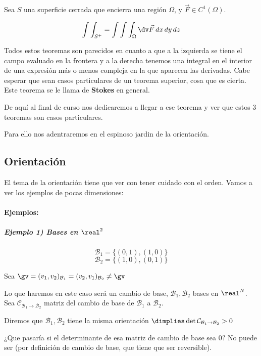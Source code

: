\begin{theorem}
Sea $S$ una superficie cerrada que encierra una región $\Omega$, y $\vec{F}\in C^1(\Omega)$.

\[ \int\int_{S^+} = \int\int\int_\Omega \dv \vec{F}\, dx\, dy\, dz \]
\end{theorem}


Todos estos teoremas son parecidos en cuanto a que a la izquierda se tiene el campo evaluado en la frontera y a la derecha tenemos una integral en el interior de una expresión más o menos compleja en la que aparecen las derivadas. Cabe esperar que sean casos particulares de un teorema superior, cosa que es cierta. Este teorema se le llama de \textbf{Stokes} en general. 

De aquí al final de curso nos dedicaremos a llegar a ese teorema y ver que estos 3 teoremas son casos particulares. 

Para ello nos adentraremos en el espinoso jardin de la orientación.

\subsection{Orientación} 
El tema de la orientación tiene que ver con tener cuidado con el orden. Vamos a ver los ejemplos de pocas dimensiones:

\paragraph{Ejemplos:}

\subparagraph{Ejemplo 1) Bases en $\real^2$}

\[\mathcal{B}_1 = \{(0,1),(1,0)\}\]
\[\mathcal{B}_2 = \{(1,0),(0,1)\}\]

Sea $\gv = (v_1,v_2)_{\mathcal{B}_1} = (v_2,v_1)_{\mathcal{B}_2} \neq \gv$

Lo que haremos en este caso será un cambio de base, $\mathcal{B}_1,\mathcal{B}_2$ bases en $\real^N$. Sea $\mathcal{C}_{\mathcal{B}_1\to\mathcal{B}_2}$ matriz del cambio de base de $\mathcal{B}_1$ a $\mathcal{B}_2$.

\begin{defn}[Orientación]
Diremos que $\mathcal{B}_1,\mathcal{B}_2$ tiene la misma orientación $\dimplies \det \mathcal{C}_{\mathcal{B}_1\to\mathcal{B}_2} > 0$
\end{defn}

¿Que pasaría si el determinante de esa matriz de cambio de base sea 0? No puede ser (por definición de cambio de base, que tiene que ser reversible).

